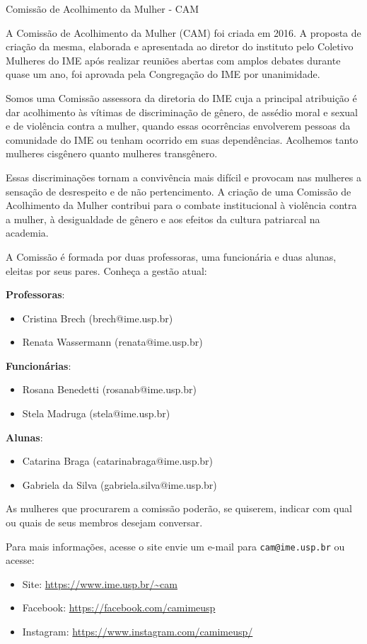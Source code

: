 \begin{subsecao}{Comissão de Acolhimento da Mulher - CAM}

A Comissão de Acolhimento da Mulher (CAM) foi criada em 2016. A proposta de 
criação da mesma, elaborada e apresentada ao diretor do instituto pelo 
Coletivo Mulheres do IME após realizar reuniões abertas com amplos debates 
durante quase um ano, foi aprovada pela Congregação do IME por unanimidade.

Somos uma Comissão assessora da diretoria do IME cuja a principal atribuição 
é dar acolhimento às vítimas de discriminação de gênero, de assédio moral e 
sexual e de violência contra a mulher, quando essas ocorrências envolverem 
pessoas da comunidade do IME ou tenham ocorrido em suas dependências. Acolhemos
tanto mulheres cisgênero quanto mulheres transgênero.

Essas discriminações tornam a convivência mais difícil e provocam nas mulheres
a sensação de desrespeito e de não pertencimento. A criação de uma Comissão de 
Acolhimento da Mulher contribui para o combate institucional à violência contra
a mulher, à desigualdade de gênero e aos efeitos da cultura patriarcal na academia.

A Comissão é formada por duas professoras, uma funcionária e duas alunas, 
eleitas por seus pares. Conheça a gestão atual: 

\textbf{Professoras}: 
\begin{itemize}
  \item Cristina Brech (brech@ime.usp.br)
  \item Renata Wassermann (renata@ime.usp.br)
\end{itemize}

\textbf{Funcionárias}: 
\begin{itemize}
  \item Rosana Benedetti (rosanab@ime.usp.br)
  \item Stela Madruga (stela@ime.usp.br)
\end{itemize}

\textbf{Alunas}: 
\begin{itemize}
  \item Catarina Braga (catarinabraga@ime.usp.br)
  \item Gabriela da Silva (gabriela.silva@ime.usp.br)
\end{itemize}

As mulheres que procurarem a comissão poderão, se quiserem, indicar com qual ou 
quais de seus membros desejam conversar.

Para mais informações, acesse o site envie um e-mail para {\tt cam@ime.usp.br} ou acesse:
\begin{itemize}
  \item Site: \url{https://www.ime.usp.br/~cam}
  \item Facebook: \url{https://facebook.com/camimeusp}
  \item Instagram: \url{https://www.instagram.com/camimeusp/}
\end{itemize}


\end{subsecao}
